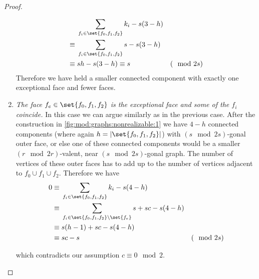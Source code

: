 \begin{proposition}
\begin{proof}
\begin{enumerate}
    \begin{align*}
      &\sum_{f_i \in \set{f_0, f_1, f_2}} k_i - s(3 - h) \\
      \equiv{}& \sum_{f_i \in \set{f_0, f_1, f_2}} s - s(3 - h) \\
      \equiv{}& s h - s(3 - h) \equiv s &(\mod 2s)
    \end{align*}
    Therefore we have held a smaller connected component with exactly one exceptional face and fewer faces.
  \item {\it The face $f_e \in \set{f_0, f_1, f_2}$ is the exceptional face and some of the $f_i$ coincide.} In this case we can argue similarly as in the previous case. After the construction in \autoref{fig:mod:graphs:nonrealizable:1} we have $4 - h$ connected components (where again $h = |\set{f_0, f_1, f_2}|$) with $(s \mod 2s)$-gonal outer face, or else one of these connected components would be a smaller $(r \mod 2r)$-valent, near $(s \mod 2s)$-gonal graph. The number of vertices of these outer faces has to add up to the number of vertices adjacent to $f_0 \cup f_1 \cup f_2$. Therefore we have
    \begin{align*}
      0{}\equiv{}&\sum_{f_i \in \set{f_0, f_1, f_2}} k_i - s(4 - h) \\
      \equiv{}& \sum_{f_i \in \set{f_0, f_1, f_2} \setminus \set{f_e}} s + sc - s(4 - h) \\
      \equiv{}& s(h - 1) + sc - s(4 - h) \\
      \equiv{}& sc - s  &(\mod 2s)
    \end{align*}

    which contradicts our assumption $c \equiv 0 \mod 2$.
  \end{enumerate}


\end{proof}
\end{proposition}
